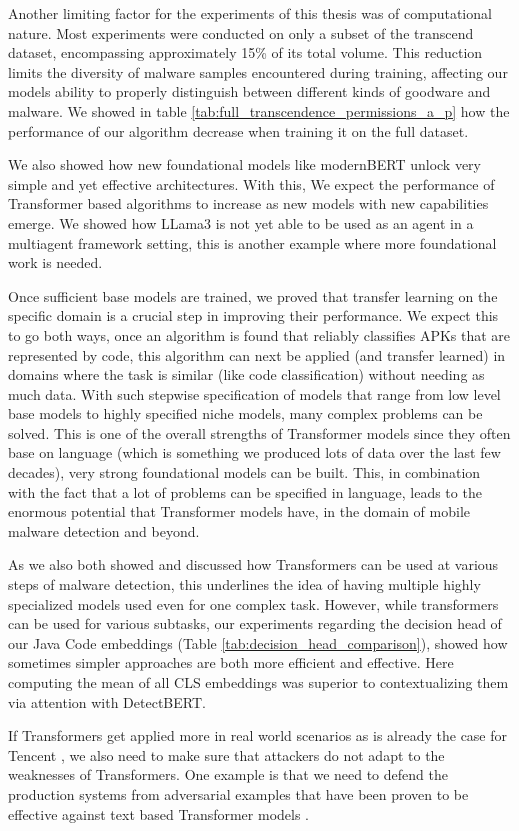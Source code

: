 Another limiting factor for the experiments of this thesis was of computational nature.
Most experiments were conducted on only a subset of the transcend dataset, 
encompassing approximately 15\% of its total volume. 
This reduction limits the diversity of malware samples encountered during training, 
affecting our models ability to properly distinguish between different kinds of goodware and malware. 
We showed in table \ref{tab:full_transcendence_permissions_a_p} how the
performance of our algorithm decrease when training it on the full dataset.

We also showed how new foundational models like modernBERT unlock very simple and yet 
effective architectures. 
With this, We expect the performance of Transformer based algorithms to increase as 
new models with new capabilities emerge. 
We showed how LLama3 \cite{llama3modelcard} is not yet able to be used as an agent 
in a multiagent framework setting, this is another example where more foundational work is needed.

Once sufficient base models are trained, we proved that transfer learning on the specific domain 
is a crucial step in improving their performance.
We expect this to go both ways, once an algorithm is found that reliably classifies APKs that are 
represented by code, this algorithm can next be applied (and transfer learned) in domains
where the task is similar (like code classification) without needing as much data.
With such stepwise specification of models that range from low level base models to
highly specified niche models, many complex problems can be solved.
This is one of the overall strengths of Transformer models since they often base on language (which
is something we produced lots of data over the last few decades), very strong foundational models
can be built. This, in combination with the fact that a lot of problems can be specified in language,
leads to the enormous potential that Transformer models have, in the domain of mobile malware detection
and beyond.

As we also both showed and discussed how Transformers can be used at various steps
of malware detection, this underlines the idea of having multiple highly specialized models used
even for one complex task.
However, while transformers can be used for various subtasks, our experiments regarding the decision
head of our Java Code embeddings (Table \ref{tab:decision_head_comparison}), 
showed how sometimes simpler approaches are both more efficient and effective. 
Here computing the mean of all CLS embeddings was superior to contextualizing them
via attention with DetectBERT.

If Transformers get applied more in real world scenarios as is already the case for
Tencent \cite{htgt}, we also need to make sure that attackers do not adapt to the weaknesses of
Transformers.
One example is that we need to defend the production systems from adversarial examples that have
been proven to be effective against text based Transformer models \cite{adversarial_transformer}.

